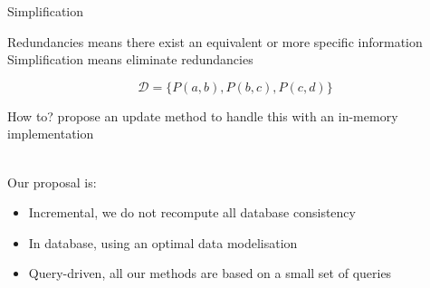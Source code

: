 \begin{frame}{Simplification}
    \begin{block}{}
        Redundancies means there exist an equivalent or more specific information
        Simplification means eliminate redundancies

        \[
            \mathcal{D} = \{P(a, b), P(b, c), P(c, d)\}
        \]
    \end{block}
    \vfill
    \begin{center}
    \end{center}
\end{frame}

\begin{frame}{How to?}
    \cite{chabinConsistentUpdatingDatabases2020} propose an update method to handle this with an in-memory implementation\\~

    Our proposal is:
    \begin{itemize}
        \item Incremental, we do not recompute all database consistency
        \item In database, using an optimal data modelisation
        \item Query-driven, all our methods are based on a small set of queries
    \end{itemize}
\end{frame}

